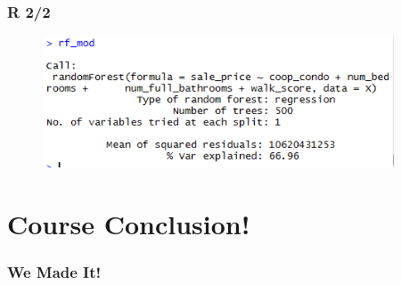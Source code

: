 \documentclass[handout]{beamer}
\begin{document}
\begin{frame}\frametitle{R 2/2}

\begin{figure}
\centering
\includegraphics[width=4.1in]{R01.png}
\end{figure}

\end{frame}

\section{Course Conclusion!}

\begin{frame}\frametitle{We Made It!}

	
\end{frame}
\end{document}
